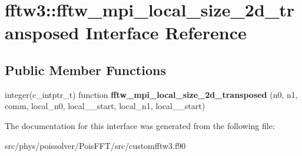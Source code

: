 \hypertarget{interfacefftw3_1_1fftw__mpi__local__size__2d__transposed}{}\section{fftw3\+:\+:fftw\+\_\+mpi\+\_\+local\+\_\+size\+\_\+2d\+\_\+transposed Interface Reference}
\label{interfacefftw3_1_1fftw__mpi__local__size__2d__transposed}
\subsection*{Public Member Functions}
\begin{DoxyCompactItemize}
\item 
integer(c\+\_\+intptr\+\_\+t) function {\bfseries fftw\+\_\+mpi\+\_\+local\+\_\+size\+\_\+2d\+\_\+transposed} (n0, n1, comm, local\+\_\+n0, local\+\_\+\_\+start, local\+\_\+n1, local\+\_\+\_\+start)\hypertarget{interfacefftw3_1_1fftw__mpi__local__size__2d__transposed_a496b5d8bb36c80567fe4585df183ea9b}{}\label{interfacefftw3_1_1fftw__mpi__local__size__2d__transposed_a496b5d8bb36c80567fe4585df183ea9b}

\end{DoxyCompactItemize}


The documentation for this interface was generated from the following file\+:\begin{DoxyCompactItemize}
\item 
src/phys/poissolver/\+Pois\+F\+F\+T/src/customfftw3.\+f90\end{DoxyCompactItemize}
